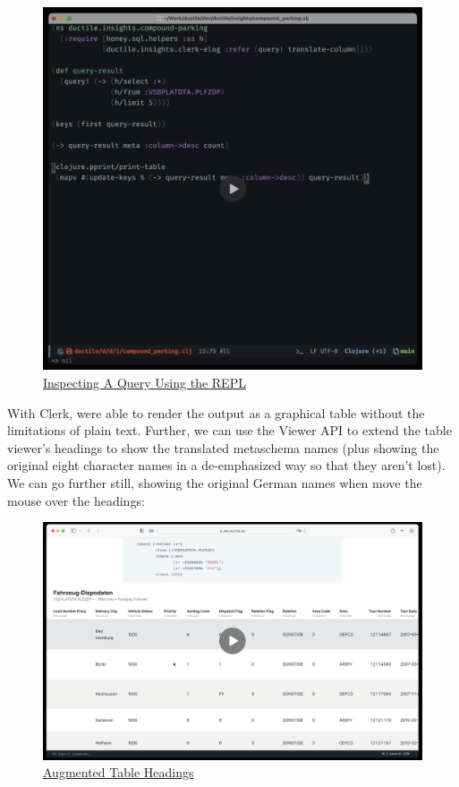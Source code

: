\documentclass[sigconf,screen]{acmart}
\begin{document}
\begin{figure}[H]
\centering
\includegraphics{images/inspecting-a-query-using-the-repl.png}
\caption{\href{https://cdn.nextjournal.com/data/QmasZmkvfx6MyJcviDK7pSYQTPkmtFoJ96YzipQBRGCVEB?content-type=image/png}{Inspecting A Query Using the REPL}}
\end{figure}

With Clerk, were able to render the output as a graphical table without the limitations of plain text. Further, we can use the Viewer API to extend the table viewer's headings to show the translated metaschema names (plus showing the original eight character names in a de-emphasized way so that they aren't lost). We can go further still, showing the original German names when move the mouse over the headings:

\begin{figure}[H]
\centering
\includegraphics{images/augmented-table-headings.png}
\caption{\href{https://cdn.nextjournal.com/data/QmRvBS2fHDyeVD8hPhFGiBFbwKbJWZDxMoMnYn1fpoMmxW?content-type=image/png}{Augmented Table Headings}}
\end{figure}
\end{document}
